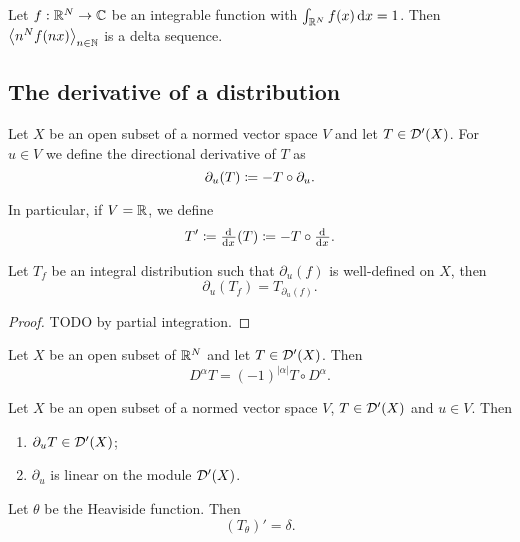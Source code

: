 \begin{lemma}
Let $f: \mathbb{R}^N\to\mathbb{C}$ be an integrable function with $\int_{\mathbb{R}^N}f(x)\operatorname{d \!}{x} = 1$. Then $\left\langle n^Nf(nx) \right\rangle_{n\in \mathbb{N}}$ is a delta sequence.
\end{lemma}

\subsection{The derivative of a distribution}
\begin{definition}
Let $X$ be an open subset of a normed vector space $V$ and let $T\in \operatorname{\mathcal{D}^\prime}(X)$. For $u\in V$ we define the directional derivative of $T$ as
\[ \partial_u(T) \coloneqq - T\circ \partial_u. \]

In particular, if $V = \mathbb{R}$, we define
\[ T' \defeq \od{}{x}(T) \defeq - T\circ \od{}{x}. \]
\end{definition}

\begin{lemma}
Let $T_f$ be an integral distribution such that $\partial_u(f)$ is well-defined on $X$, then
\[ \partial_u(T_f) = T_{\partial_{u}(f)}. \]
\end{lemma}
\begin{proof}
TODO by partial integration.
\end{proof}

\begin{lemma}
Let $X$ be an open subset of $\mathbb{R}^N$ and let $T\in \operatorname{\mathcal{D}^\prime}(X)$. Then
\[ D^\alpha T = (-1)^{|\alpha|}T\circ D^\alpha. \]
\end{lemma}

\begin{proposition}
    Let $X$ be an open subset of a normed vector space $V$, $T\in \operatorname{\mathcal{D}^\prime}(X)$ and $u\in V$. Then
    \begin{enumerate}
    \item $\partial_{u}T \in \operatorname{\mathcal{D}^\prime}(X)$;
    \item $\partial_{u}$ is linear on the module $\operatorname{\mathcal{D}^\prime}(X)$.
    \end{enumerate}
\end{proposition}

\begin{proposition}
Let $\theta$ be the Heaviside function. Then
\[ (T_\theta)' = \delta. \]
\end{proposition}

